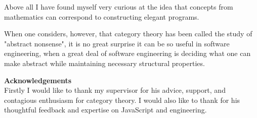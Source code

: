 \documentclass[a4paper,10pt]{article}
\theoremstyle{definition}
\begin{document}
Above all I have found myself very curious at the idea that concepts
from mathematics can correspond to constructing elegant programs.

When one considers, however,
that category theory has been called the study
of "abstract nonsense"\cite{mac1997pnas},
it is no great surprise it can be so useful in software engineering,
when a great deal of software engineering is deciding what one
can make abstract while maintaining necessary structural properties.

\textbf{Acknowledgements}\\
Firstly I would like to thank my supervisor
for his advice, support, and contagious enthusiasm for category theory.
I would also like to thank for his thoughtful feedback
and expertise on JavaScript and engineering.

\pagebreak
\appendix



\pagebreak


\end{document}
